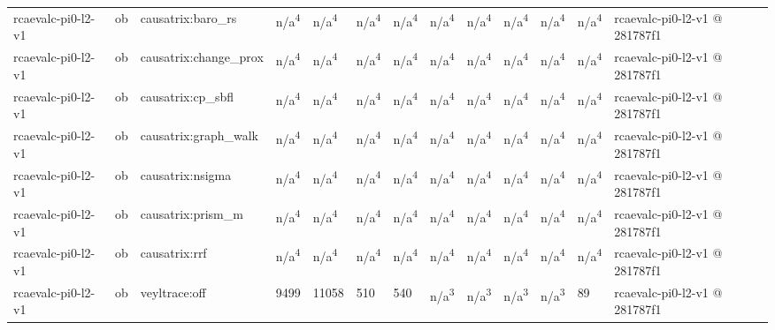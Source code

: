 \begin{table}[t]
\begin{tabular}{lllllllllllll}
rcaevalc-pi0-l2-v1 & ob & causatrix:baro\_rs & n/a\textsuperscript{4} & n/a\textsuperscript{4} & n/a\textsuperscript{4} & n/a\textsuperscript{4} & n/a\textsuperscript{4} & n/a\textsuperscript{4} & n/a\textsuperscript{4} & n/a\textsuperscript{4} & n/a\textsuperscript{4} & rcaevalc-pi0-l2-v1 @ 281787f1 \\
rcaevalc-pi0-l2-v1 & ob & causatrix:change\_prox & n/a\textsuperscript{4} & n/a\textsuperscript{4} & n/a\textsuperscript{4} & n/a\textsuperscript{4} & n/a\textsuperscript{4} & n/a\textsuperscript{4} & n/a\textsuperscript{4} & n/a\textsuperscript{4} & n/a\textsuperscript{4} & rcaevalc-pi0-l2-v1 @ 281787f1 \\
rcaevalc-pi0-l2-v1 & ob & causatrix:cp\_sbfl & n/a\textsuperscript{4} & n/a\textsuperscript{4} & n/a\textsuperscript{4} & n/a\textsuperscript{4} & n/a\textsuperscript{4} & n/a\textsuperscript{4} & n/a\textsuperscript{4} & n/a\textsuperscript{4} & n/a\textsuperscript{4} & rcaevalc-pi0-l2-v1 @ 281787f1 \\
rcaevalc-pi0-l2-v1 & ob & causatrix:graph\_walk & n/a\textsuperscript{4} & n/a\textsuperscript{4} & n/a\textsuperscript{4} & n/a\textsuperscript{4} & n/a\textsuperscript{4} & n/a\textsuperscript{4} & n/a\textsuperscript{4} & n/a\textsuperscript{4} & n/a\textsuperscript{4} & rcaevalc-pi0-l2-v1 @ 281787f1 \\
rcaevalc-pi0-l2-v1 & ob & causatrix:nsigma & n/a\textsuperscript{4} & n/a\textsuperscript{4} & n/a\textsuperscript{4} & n/a\textsuperscript{4} & n/a\textsuperscript{4} & n/a\textsuperscript{4} & n/a\textsuperscript{4} & n/a\textsuperscript{4} & n/a\textsuperscript{4} & rcaevalc-pi0-l2-v1 @ 281787f1 \\
rcaevalc-pi0-l2-v1 & ob & causatrix:prism\_m & n/a\textsuperscript{4} & n/a\textsuperscript{4} & n/a\textsuperscript{4} & n/a\textsuperscript{4} & n/a\textsuperscript{4} & n/a\textsuperscript{4} & n/a\textsuperscript{4} & n/a\textsuperscript{4} & n/a\textsuperscript{4} & rcaevalc-pi0-l2-v1 @ 281787f1 \\
rcaevalc-pi0-l2-v1 & ob & causatrix:rrf & n/a\textsuperscript{4} & n/a\textsuperscript{4} & n/a\textsuperscript{4} & n/a\textsuperscript{4} & n/a\textsuperscript{4} & n/a\textsuperscript{4} & n/a\textsuperscript{4} & n/a\textsuperscript{4} & n/a\textsuperscript{4} & rcaevalc-pi0-l2-v1 @ 281787f1 \\
rcaevalc-pi0-l2-v1 & ob & veyltrace:off & 9499 & 11058 & 510 & 540 & n/a\textsuperscript{3} & n/a\textsuperscript{3} & n/a\textsuperscript{3} & n/a\textsuperscript{3} & 89 & rcaevalc-pi0-l2-v1 @ 281787f1 \\

\end{tabular}
\end{table}
